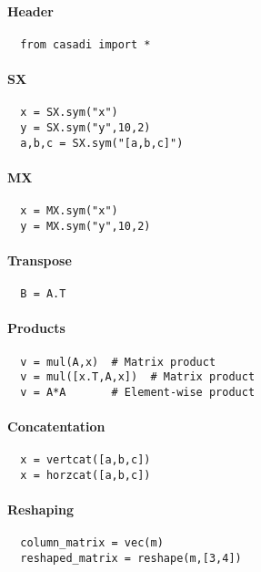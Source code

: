 \documentclass[a4paper,8pt]{article}
\begin{document}
\begin{multicols}{2}

\paragraph{Header}
\begin{verbatim}
  from casadi import *
\end{verbatim}

\paragraph{SX}
\begin{verbatim}
  x = SX.sym("x")
  y = SX.sym("y",10,2)
  a,b,c = SX.sym("[a,b,c]")
\end{verbatim}

\paragraph{MX}
\begin{verbatim}
  x = MX.sym("x")
  y = MX.sym("y",10,2)
\end{verbatim}

\paragraph{Transpose}
\begin{verbatim}
  B = A.T
\end{verbatim}

\paragraph{Products}
\begin{verbatim}
  v = mul(A,x)  # Matrix product
  v = mul([x.T,A,x])  # Matrix product
  v = A*A       # Element-wise product
\end{verbatim}

\paragraph{Concatentation}
\begin{verbatim}
  x = vertcat([a,b,c])
  x = horzcat([a,b,c])
\end{verbatim}

\paragraph{Reshaping}
\begin{verbatim}
  column_matrix = vec(m)
  reshaped_matrix = reshape(m,[3,4])
\end{verbatim}


\end{multicols}
\end{document}
